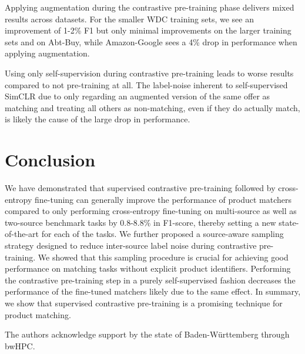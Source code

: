 \documentclass[sigconf]{acmart}
\begin{document}
Applying augmentation during the contrastive pre-training phase delivers mixed results across datasets. For the smaller WDC training sets, we see an improvement of 1-2\% F1 but only minimal improvements on the larger training sets and on Abt-Buy, while Amazon-Google sees a 4\% drop in performance when applying augmentation.

Using only self-supervision during contrastive pre-training leads to worse results compared to not pre-training at all. The label-noise inherent to self-supervised SimCLR due to only regarding an augmented version of the same offer as matching and treating all others as non-matching, even if they do actually match, is likely the cause of the large drop in performance.







\section{Conclusion}
\label{sec:conclusion}

We have demonstrated that supervised contrastive pre-training followed by cross-entropy fine-tuning can generally improve the performance of product matchers compared to only performing cross-entropy fine-tuning on multi-source as well as two-source benchmark tasks by 0.8-8.8\% in F1-score, thereby setting a new state-of-the-art for each of the tasks. We further proposed a source-aware sampling strategy designed to reduce inter-source label noise during contrastive pre-training. We showed that this sampling procedure is crucial for achieving good performance on matching tasks without explicit product identifiers. Performing the contrastive pre-training step in a purely self-supervised fashion decreases the performance of the fine-tuned matchers likely due to the same effect. In summary, we show that supervised contrastive pre-training is a promising technique for product matching. 

\begin{acks}
The authors acknowledge support by the state of Baden-Württemberg through bwHPC.
\end{acks}



\end{document}
